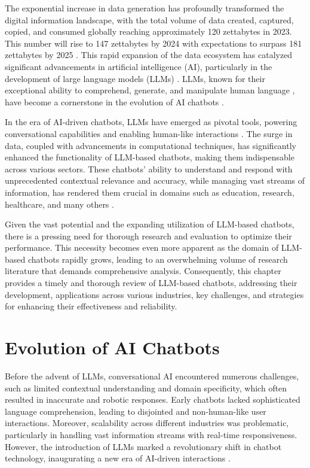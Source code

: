 The exponential increase in data generation has profoundly transformed the digital information landscape, with the total volume of data created, captured, copied, and consumed globally reaching approximately 120 zettabytes in 2023. This number will rise to 147 zettabytes by 2024 with expectations to surpass 181 zettabytes by 2025 \cite{taylor2023volume}. This rapid expansion of the data ecosystem has catalyzed significant advancements in artificial intelligence (AI), particularly in the development of large language models (LLMs) \cite{zhao2023survey}. LLMs, known for their exceptional ability to comprehend, generate, and manipulate human language \cite{brown2020language}, have become a cornerstone in the evolution of AI chatbots \cite{dam2024complete}.


In the era of AI-driven chatbots, LLMs have emerged as pivotal tools, powering conversational capabilities and enabling human-like interactions \cite{koubaa2023exploring}. The surge in data, coupled with advancements in computational techniques, has significantly enhanced the functionality of LLM-based chatbots, making them indispensable across various sectors. These chatbots' ability to understand and respond with unprecedented contextual relevance and accuracy, while managing vast streams of information, has rendered them crucial in domains such as education, research, healthcare, and many others \cite{dam2024complete}.

Given the vast potential and the expanding utilization of LLM-based chatbots, there is a pressing need for thorough research and evaluation to optimize their performance. This necessity becomes even more apparent as the domain of LLM-based chatbots rapidly grows, leading to an overwhelming volume of research literature that demands comprehensive analysis. Consequently, this chapter provides a timely and thorough review of LLM-based chatbots, addressing their development, applications across various industries, key challenges, and strategies for enhancing their effectiveness and reliability. %

\section{Evolution of AI Chatbots}

Before the advent of LLMs, conversational AI encountered numerous challenges, such as limited contextual understanding and domain specificity, which often resulted in inaccurate and robotic responses. Early chatbots lacked sophisticated language comprehension, leading to disjointed and non-human-like user interactions. Moreover, scalability across different industries was problematic, particularly in handling vast information streams with real-time responsiveness. However, the introduction of LLMs marked a revolutionary shift in chatbot technology, inaugurating a new era of AI-driven interactions \cite{dam2024complete}.

